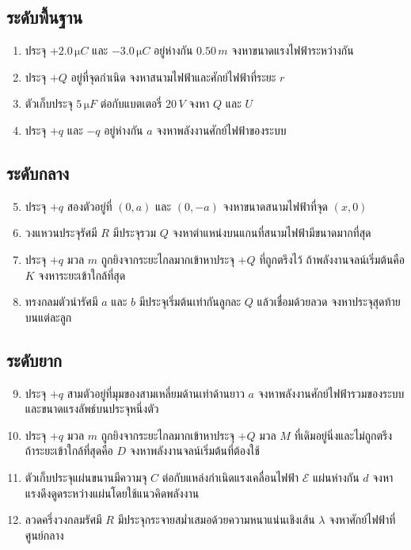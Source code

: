 \subsection*{ระดับพื้นฐาน}

\begin{enumerate}
    \item ประจุ $+2.0\,\si{\micro C}$ และ $-3.0\,\si{\micro C}$ อยู่ห่างกัน $0.50\,\si{m}$ จงหาขนาดแรงไฟฟ้าระหว่างกัน
    \item ประจุ $+Q$ อยู่ที่จุดกำเนิด จงหาสนามไฟฟ้าและศักย์ไฟฟ้าที่ระยะ $r$
    \item ตัวเก็บประจุ $5\,\si{\micro F}$ ต่อกับแบตเตอรี่ $20\,\si{V}$ จงหา $Q$ และ $U$
    \item ประจุ $+q$ และ $-q$ อยู่ห่างกัน $a$ จงหาพลังงานศักย์ไฟฟ้าของระบบ
\end{enumerate}

\subsection*{ระดับกลาง}

\begin{enumerate}
    \setcounter{enumi}{4}
    \item ประจุ $+q$ สองตัวอยู่ที่ $(0,a)$ และ $(0,-a)$ จงหาขนาดสนามไฟฟ้าที่จุด $(x,0)$
    \item วงแหวนประจุรัศมี $R$ มีประจุรวม $Q$ จงหาตำแหน่งบนแกนที่สนามไฟฟ้ามีขนาดมากที่สุด
    \item ประจุ $+q$ มวล $m$ ถูกยิงจากระยะไกลมากเข้าหาประจุ $+Q$ ที่ถูกตรึงไว้ ถ้าพลังงานจลน์เริ่มต้นคือ $K$ จงหาระยะเข้าใกล้ที่สุด
    \item ทรงกลมตัวนำรัศมี $a$ และ $b$ มีประจุเริ่มต้นเท่ากันลูกละ $Q$ แล้วเชื่อมด้วยลวด จงหาประจุสุดท้ายบนแต่ละลูก
\end{enumerate}

\subsection*{ระดับยาก}

\begin{enumerate}
    \setcounter{enumi}{8}
    \item ประจุ $+q$ สามตัวอยู่ที่มุมของสามเหลี่ยมด้านเท่าด้านยาว $a$ จงหาพลังงานศักย์ไฟฟ้ารวมของระบบ และขนาดแรงลัพธ์บนประจุหนึ่งตัว
    \item ประจุ $+q$ มวล $m$ ถูกยิงจากระยะไกลมากเข้าหาประจุ $+Q$ มวล $M$ ที่เดิมอยู่นิ่งและไม่ถูกตรึง ถ้าระยะเข้าใกล้ที่สุดคือ $D$ จงหาพลังงานจลน์เริ่มต้นที่ต้องใช้
    \item ตัวเก็บประจุแผ่นขนานมีความจุ $C$ ต่อกับแหล่งกำเนิดแรงเคลื่อนไฟฟ้า $\mathcal{E}$ แผ่นห่างกัน $d$ จงหาแรงดึงดูดระหว่างแผ่นโดยใช้แนวคิดพลังงาน
    \item ลวดครึ่งวงกลมรัศมี $R$ มีประจุกระจายสม่ำเสมอด้วยความหนาแน่นเชิงเส้น $\lambda$ จงหาศักย์ไฟฟ้าที่ศูนย์กลาง
\end{enumerate}

